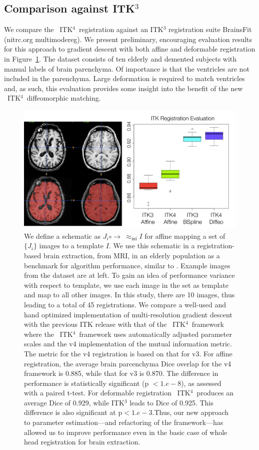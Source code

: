 \documentclass{llncs}
\newcommand{\tk}{~ITK$^{\text{4}}$~}
\begin{document}
\subsection{Comparison against ITK$^3$}
We compare the \tk registration against an ITK$^3$ registration suite
BrainsFit (nitrc.org multimodereg).  
We present preliminary, encouraging evaluation results for this approach to
gradient descent with both affine and deformable registration in Figure~\ref{fig:eval}.
The dataset consists of ten elderly and demented subjects with manual labels of brain
parenchyma.  Of importance is that the ventricles are not included in
the parenchyma.  Large deformation is required to match ventricles
and, as such, this evaluation provides some insight into the benefit
of the new \tk diffeomorphic matching.
\begin{figure}[t]
\begin{center}
\includegraphics[width=4.5in]{figs/eval_brain.pdf}
\caption{We define a schematic as $J_i \circ \rightarrow
~\approx_\text{mi} I$ for affine mapping a set of $\{ J_i \}$ images
to a template $I$. We use this schematic in a registration-based
brain extraction, from MRI, in an elderly population as a benchmark
for algorithm performance, similar to \cite{Klein2010}.  Example images from the dataset are at left.   To gain an
idea of performance variance with respect to template, we use each
image in the set as template and map to all other images.  In this
study, there are 10 images, thus leading to a total of 45
registrations.  We compare a well-used and hand optimized
implementation of multi-resolution gradient descent with the previous
ITK release with that of the \tk framework where the \tk framework
uses automatically adjusted parameter scales and the v4 implementation
of the mutual information metric.  The metric for the v4 registration
is based on that for v3.  For affine registration, the average brain parcenchyma Dice overlap
for the v4 framework is 0.885, while that for v3 is 0.870.  The difference in performance is statistically
significant (p $< 1.e-8$), as assessed with a paired t-test.  For
deformable registration \tk produces an average Dice of 0.929, while
ITK$^3$ leads to Dice of 0.925.  This difference is also significant
at p$< 1.e-3$.Thus, our
new approach to parameter estimation---and refactoring of the
framework---has allowed us to improve performance even in the basic
case of whole head registration for brain extraction.}
\label{fig:eval}
\end{center}
\end{figure}
\end{document}
